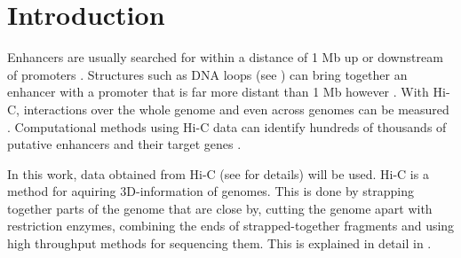 \chapter{Introduction}\label{chap:introduction}

%
%
%
%
%
%


Enhancers are usually searched for within a distance of 1 Mb up or downstream
of promoters \cite{pennacchio2013enhancers}. Structures such as DNA loops (see
) can bring together an enhancer with a promoter
that is far more distant than 1 Mb however \cite{pennacchio2013enhancers}. With
Hi-C, interactions over the whole genome \cite{lieberman2009comprehensive} and
even across genomes can be measured \cite{rao20143d}. Computational methods
using Hi-C data can identify hundreds of thousands of putative enhancers and
their target genes \cite{ron2017promoter}.

In this work, data obtained from Hi-C (see  for
details) will be used. Hi-C is a method for aquiring 3D-information of genomes.
This is done by strapping together parts of the genome that are close by,
cutting the genome apart with restriction enzymes, combining the ends of
strapped-together fragments and using high throughput methods for sequencing
them. This is explained in detail in .


